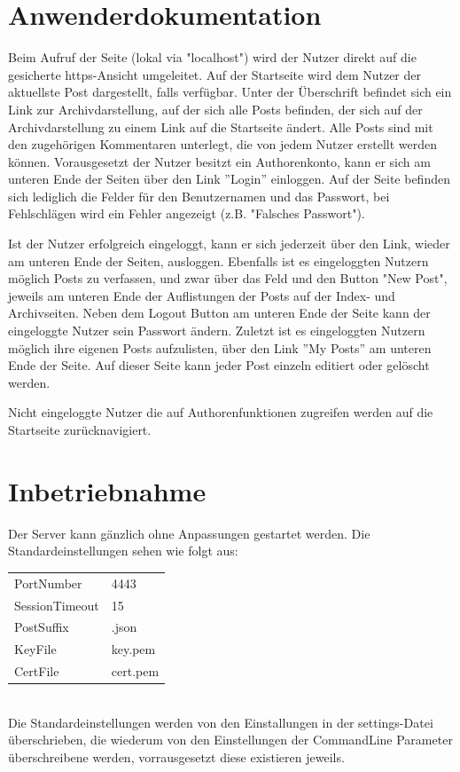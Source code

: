 \documentclass[10pt]{article}
\begin{document}
	\section{Anwenderdokumentation}
	Beim Aufruf der Seite (lokal via "localhost") wird der Nutzer direkt auf die gesicherte https-Ansicht umgeleitet.
	Auf der Startseite wird dem Nutzer der aktuellste Post dargestellt, falls verf\"ugbar.
	Unter der \"Uberschrift befindet sich ein Link zur Archivdarstellung, auf der sich alle Posts befinden, der sich auf der Archivdarstellung zu einem Link auf die Startseite \"andert.
	Alle Posts sind mit den zugeh\"origen Kommentaren unterlegt, die von jedem Nutzer erstellt werden k\"onnen.
	Vorausgesetzt der Nutzer besitzt ein Authorenkonto, kann er sich am unteren Ende der Seiten \"uber den Link ''Login'' einloggen.
	Auf der Seite befinden sich lediglich die Felder f\"ur den Benutzernamen und das Passwort, bei Fehlschl\"agen wird ein Fehler angezeigt (z.B. "Falsches Passwort").
	
	Ist der Nutzer erfolgreich eingeloggt, kann er sich jederzeit \"uber den Link, wieder am unteren Ende der Seiten, ausloggen.
	Ebenfalls ist es eingeloggten Nutzern m\"oglich Posts zu verfassen, und zwar \"uber das Feld und den Button "New Post", jeweils am unteren Ende der Auflistungen der Posts auf der Index- und Archivseiten.
	Neben dem Logout Button am unteren Ende der Seite kann der eingeloggte Nutzer sein Passwort \"andern.
	Zuletzt ist es eingeloggten Nutzern m\"oglich ihre eigenen Posts aufzulisten, \"uber den Link ''My Posts'' am unteren Ende der Seite.
	Auf dieser Seite kann jeder Post einzeln editiert oder gel\"oscht werden.
	
	Nicht eingeloggte Nutzer die auf Authorenfunktionen zugreifen werden auf die Startseite zur\"ucknavigiert.
	\section{Inbetriebnahme}
		Der Server kann g\"anzlich ohne Anpassungen gestartet werden.
		Die Standardeinstellungen sehen wie folgt aus:
		\begin{tabular}{l|l}
			PortNumber &     4443\\
			SessionTimeout & 15\\
			PostSuffix & .json\\
			KeyFile & key.pem\\
			CertFile & cert.pem\\
		\end{tabular}\\
		Die Standardeinstellungen werden von den Einstallungen in der settings-Datei \"uberschrieben, die wiederum von den Einstellungen der CommandLine Parameter \"uberschreibene werden, vorrausgesetzt diese existieren jeweils.
\end{document}
